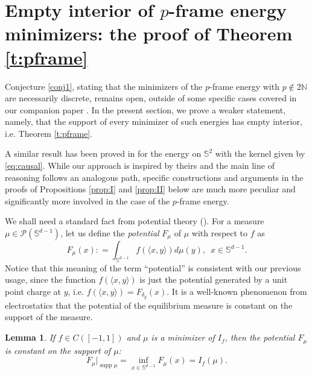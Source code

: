 \documentclass[11pt, leqno]{amsart}
\def\S{\mathbb S}
\newtheorem{lemma}[theorem]{Lemma}
\theoremstyle{definition}
\numberwithin{equation}{section}
\begin{document}
\section{Empty interior of $p$-frame energy minimizers: the proof of Theorem \ref{t:pframe}}\label{sec:Empty interior, p-frame}

Conjecture \ref{conj1}, stating that the minimizers of the $p$-frame energy with $p\not\in 2 \mathbb N$ are necessarily discrete, remains open, outside of some specific cases covered in our companion paper \cite{BGMPV}. In the present section, we prove a weaker statement, namely,  that the support of every  minimizer of such energies has empty interior, i.e. Theorem \ref{t:pframe}. 



A similar result has been proved in \cite{finsterSupport2013} for the energy on $\S^2$ with the kernel given by \eqref{eq:causal}. While our approach is inspired by theirs and the main line of reasoning  follows an analogous path, specific constructions and arguments  in the proofs of  Propositions \ref{prop:I} and \ref{prop:II} below are much more peculiar and significantly more involved in the case of the $p$-frame energy. 

We shall need  a standard fact from potential theory (\cite{Bjorck1956, borodachovMinimal, landkofFoun1972}). 
For a measure $\mu \in \mathcal P(\S^{d-1})$, let us define the {\em{potential}} $F_\mu$ of $\mu$ with respect to $f$ as
\begin{equation}\label{e.4.6}
F_\mu(x) : = \int_{\mathbb{S}^{d-1}} f( \langle x, y \rangle) d \mu(y),\,\,\, x\in \S^{d-1}.
\end{equation}
Notice that this meaning  of the term ``potential'' is consistent with our previous usage, since the function $f( \langle x, y \rangle)$ is just the potential generated by a unit point charge at $y$, i.e. $ f( \langle x, y \rangle) = F_{\delta_y} (x)$. It is a well-known phenomenon from electrostatics that the potential of the equilibrium measure is constant on the support of the measure.
\begin{lemma}\label{lem:const_pot} If $f \in C([-1,1])$ and $\mu$ is a minimizer of $I_f$, then the potential $F_{\mu}$ 
is constant on the support of $\mu$:
\begin{equation}
 F_{\mu} \big|_{\operatorname{supp} \mu} = \inf_{ x \in \mathbb{S}^{d-1}} F_{\mu}(x) = I_{f}(\mu).
 \end{equation}
\end{lemma}
\end{document}
